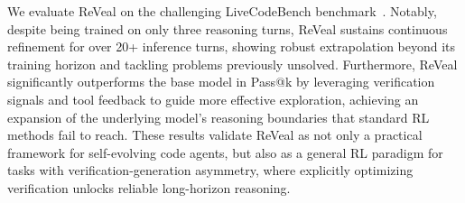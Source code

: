 \documentclass{article} %
\begin{document}
We evaluate ReVeal on the challenging LiveCodeBench benchmark~\citep{jain2024livecodebenchholisticcontaminationfree}. Notably, despite being trained on only three reasoning turns, ReVeal sustains continuous refinement for over 20+ inference turns, showing robust extrapolation beyond its training horizon and tackling problems previously unsolved. 
Furthermore, ReVeal significantly outperforms the base model in Pass@k by leveraging verification signals and tool feedback to guide more effective exploration, achieving an expansion of the underlying model’s reasoning boundaries that standard RL methods fail to reach.
These results validate ReVeal as not only a practical framework for self-evolving code agents, but also as a general RL paradigm for tasks with verification-generation asymmetry, where explicitly optimizing verification unlocks reliable long-horizon reasoning.


\end{document}
